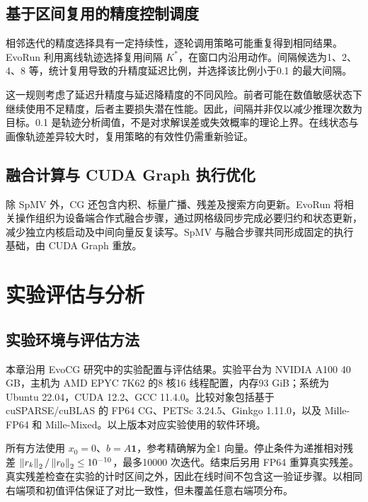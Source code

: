 \subsection{基于区间复用的精度控制调度}
相邻迭代的精度选择具有一定持续性，逐轮调用策略可能重复得到相同结果。EvoRun 利用离线轨迹选择复用间隔 $K^*$，在窗口内沿用动作。间隔候选为1、2、4、8 等，统计复用导致的升精度延迟比例，并选择该比例小于0.1 的最大间隔。

这一规则考虑了延迟升精度与延迟降精度的不同风险。前者可能在数值敏感状态下继续使用不足精度，后者主要损失潜在性能。因此，间隔并非仅以减少推理次数为目标。0.1 是轨迹分析阈值，不是对求解误差或失效概率的理论上界。在线状态与画像轨迹差异较大时，复用策略的有效性仍需重新验证。

\subsection{融合计算与 CUDA Graph 执行优化}
除 SpMV 外，CG 还包含内积、标量广播、残差及搜索方向更新。EvoRun 将相关操作组织为设备端合作式融合步骤，通过网格级同步完成必要归约和状态更新，减少独立内核启动及中间向量反复读写。SpMV 与融合步骤共同形成固定的执行基础，由 CUDA Graph 重放。


\section{实验评估与分析}
\subsection{实验环境与评估方法}
本章沿用 EvoCG 研究中的实验配置与评估结果\cite{evocg2027}。实验平台为 NVIDIA A100 40 GB，主机为 AMD EPYC 7K62 的8 核16 线程配置，内存93 GiB；系统为 Ubuntu 22.04，CUDA 12.2、GCC 11.4.0。比较对象包括基于 cuSPARSE/cuBLAS 的 FP64 CG、PETSc 3.24.5、Ginkgo 1.11.0，以及 Mille-FP64 和 Mille-Mixed。以上版本对应实验使用的软件环境。

所有方法使用 $x_0=0$、$b=A\mathbf{1}$，参考精确解为全1 向量。停止条件为递推相对残差 $\left\lVert r_k\right\rVert_2/\left\lVert r_0\right\rVert_2\leq10^{-10}$，最多10000 次迭代。结束后另用 FP64 重算真实残差。真实残差检查在实验的计时区间之外，因此在线时间不包含这一验证步骤。以相同右端项和初值评估保证了对比一致性，但未覆盖任意右端项分布。

